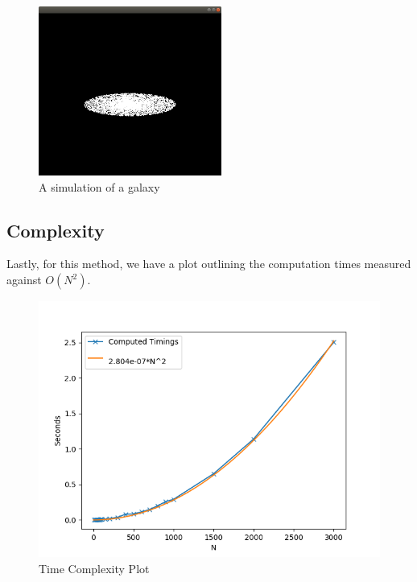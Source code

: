 \documentclass{article}
\begin{document}
\begin{figure}[htb]
\begin{center}
\includegraphics[width=6cm]{images/space.jpg}
\caption{A simulation of a galaxy}
\end{center}
\end{figure}
\newpage
\subsection{Complexity}
Lastly, for this method, we have a plot outlining the computation times measured against $O(N^{2})$.
\begin{figure}[htb]
\begin{center}
\includegraphics[width=14cm]{images/time_complexity.png}
\caption{Time Complexity Plot}
\end{center}
\end{figure}
\end{document}

